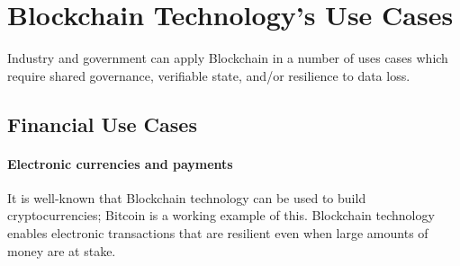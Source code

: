 
\section{Blockchain Technology's Use Cases}
\label{sec:use-cases}

Industry and government can apply Blockchain in a number of uses cases which 
require shared governance, verifiable state, and/or resilience to data loss. 


\subsection{Financial Use Cases}

\paragraph{Electronic currencies and payments}


It is well-known that Blockchain technology can be used to build cryptocurrencies; Bitcoin is a working example of this.
Blockchain technology enables electronic transactions that are resilient even 
when large amounts of money are at stake.

